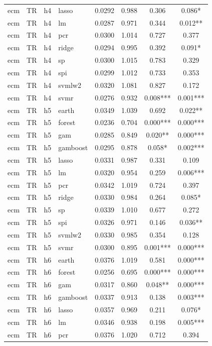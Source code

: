 \begin{ThreePartTable}
\begin{longtable}[t]{llclcccc}
ecm & TR & h4 & lasso & 0.0292 & 0.988 & 0.306 & 0.086*\\
ecm & TR & h4 & lm & 0.0287 & 0.971 & 0.344 & 0.012**\\
ecm & TR & h4 & pcr & 0.0300 & 1.014 & 0.727 & 0.377\\
ecm & TR & h4 & ridge & 0.0294 & 0.995 & 0.392 & 0.091*\\
ecm & TR & h4 & sp & 0.0300 & 1.015 & 0.783 & 0.329\\
ecm & TR & h4 & spi & 0.0299 & 1.012 & 0.733 & 0.353\\
ecm & TR & h4 & svmlw2 & 0.0320 & 1.081 & 0.827 & 0.172\\
ecm & TR & h4 & svmr & 0.0276 & 0.932 & 0.008*** & 0.001***\\
\addlinespace
ecm & TR & h5 & earth & 0.0349 & 1.039 & 0.692 & 0.022**\\
ecm & TR & h5 & forest & 0.0236 & 0.704 & 0.000*** & 0.000***\\
ecm & TR & h5 & gam & 0.0285 & 0.849 & 0.020** & 0.000***\\
ecm & TR & h5 & gamboost & 0.0295 & 0.878 & 0.058* & 0.002***\\
ecm & TR & h5 & lasso & 0.0331 & 0.987 & 0.331 & 0.109\\
ecm & TR & h5 & lm & 0.0320 & 0.954 & 0.259 & 0.006***\\
ecm & TR & h5 & pcr & 0.0342 & 1.019 & 0.724 & 0.397\\
ecm & TR & h5 & ridge & 0.0330 & 0.984 & 0.264 & 0.085*\\
ecm & TR & h5 & sp & 0.0339 & 1.010 & 0.677 & 0.272\\
ecm & TR & h5 & spi & 0.0326 & 0.971 & 0.146 & 0.036**\\
ecm & TR & h5 & svmlw2 & 0.0330 & 0.985 & 0.354 & 0.128\\
ecm & TR & h5 & svmr & 0.0300 & 0.895 & 0.001*** & 0.000***\\
\addlinespace
ecm & TR & h6 & earth & 0.0376 & 1.019 & 0.581 & 0.000***\\
ecm & TR & h6 & forest & 0.0256 & 0.695 & 0.000*** & 0.000***\\
ecm & TR & h6 & gam & 0.0317 & 0.860 & 0.048** & 0.000***\\
ecm & TR & h6 & gamboost & 0.0337 & 0.913 & 0.138 & 0.003***\\
ecm & TR & h6 & lasso & 0.0357 & 0.969 & 0.211 & 0.076*\\
ecm & TR & h6 & lm & 0.0346 & 0.938 & 0.198 & 0.005***\\
ecm & TR & h6 & pcr & 0.0376 & 1.020 & 0.712 & 0.394\\

\end{longtable}
\end{ThreePartTable}
